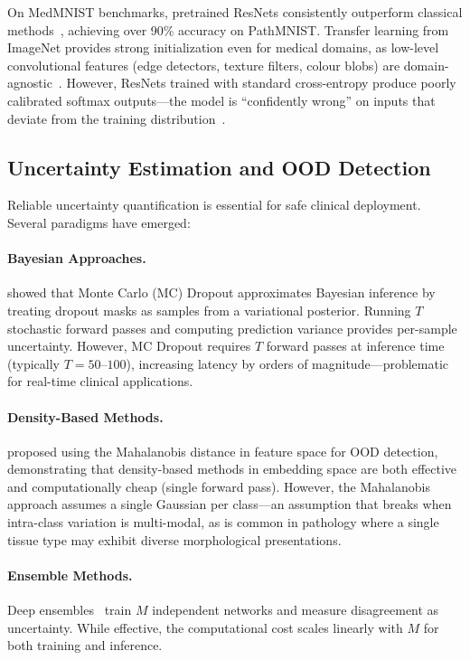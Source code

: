 \documentclass{article}
\begin{document}
On MedMNIST benchmarks, pretrained ResNets consistently outperform classical methods~\citep{yang2023medmnist}, achieving over 90\% accuracy on PathMNIST. Transfer learning from ImageNet provides strong initialization even for medical domains, as low-level convolutional features (edge detectors, texture filters, colour blobs) are domain-agnostic~\citep{yosinski2014transferable}. However, ResNets trained with standard cross-entropy produce poorly calibrated softmax outputs---the model is ``confidently wrong'' on inputs that deviate from the training distribution~\citep{guo2017calibration}.

\subsection{Uncertainty Estimation and OOD Detection}

Reliable uncertainty quantification is essential for safe clinical deployment. Several paradigms have emerged:

\paragraph{Bayesian Approaches.} \citet{gal2016dropout} showed that Monte Carlo (MC) Dropout approximates Bayesian inference by treating dropout masks as samples from a variational posterior. Running $T$ stochastic forward passes and computing prediction variance provides per-sample uncertainty. However, MC Dropout requires $T$ forward passes at inference time (typically $T = 50$--$100$), increasing latency by orders of magnitude---problematic for real-time clinical applications.

\paragraph{Density-Based Methods.} \citet{lee2018simple} proposed using the Mahalanobis distance in feature space for OOD detection, demonstrating that density-based methods in embedding space are both effective and computationally cheap (single forward pass). However, the Mahalanobis approach assumes a single Gaussian per class---an assumption that breaks when intra-class variation is multi-modal, as is common in pathology where a single tissue type may exhibit diverse morphological presentations.

\paragraph{Ensemble Methods.} Deep ensembles~\citep{lakshminarayanan2017simple} train $M$ independent networks and measure disagreement as uncertainty. While effective, the computational cost scales linearly with $M$ for both training and inference.
\end{document}
